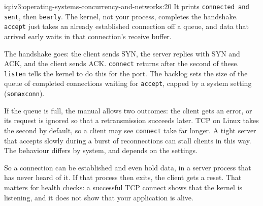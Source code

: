 \begin{solution}{iq:iv3:operating-systems-concurrency-and-networks:20}
It prints \texttt{connected and sent}, then \texttt{b\textquotesingle{}early\textquotesingle{}}. The kernel, not your process, completes the handshake. \texttt{accept} just takes an already established connection off a queue, and data that arrived early waits in that connection's receive buffer.

The handshake goes: the client sends SYN, the server replies with SYN and ACK, and the client sends ACK. \texttt{connect} returns after the second of these. \texttt{listen} tells the kernel to do this for the port. The backlog sets the size of the queue of completed connections waiting for \texttt{accept}, capped by a system setting (\texttt{somaxconn}).

If the queue is full, the manual allows two outcomes: the client gets an error, or its request is ignored so that a retransmission succeeds later. TCP on Linux takes the second by default, so a client may see \texttt{connect} take far longer. A tight server that accepts slowly during a burst of reconnections can stall clients in this way. The behaviour differs by system, and depends on the settings.

So a connection can be established and even hold data, in a server process that has never heard of it. If that process then exits, the client gets a reset. That matters for health checks: a successful TCP connect shows that the kernel is listening, and it does not show that your application is alive.

\end{solution}

